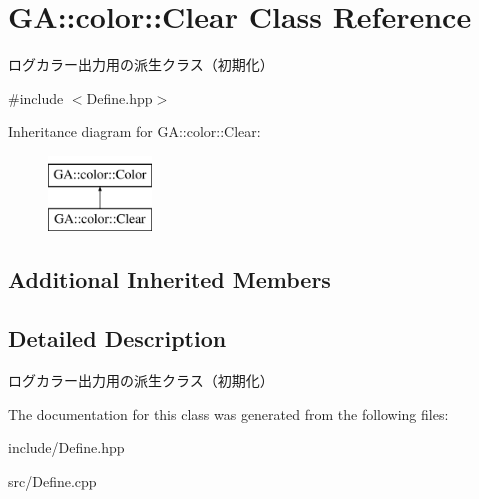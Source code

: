 \hypertarget{class_g_a_1_1color_1_1_clear}{}\section{GA\+::color\+::Clear Class Reference}
\label{class_g_a_1_1color_1_1_clear}


ログカラー出力用の派生クラス（初期化）  




{\ttfamily \#include $<$Define.\+hpp$>$}

Inheritance diagram for GA\+::color\+::Clear\+:\begin{figure}[H]
\begin{center}
\leavevmode
\includegraphics[height=2.000000cm]{class_g_a_1_1color_1_1_clear}
\end{center}
\end{figure}
\subsection*{Additional Inherited Members}


\subsection{Detailed Description}
ログカラー出力用の派生クラス（初期化） 



The documentation for this class was generated from the following files\+:\begin{DoxyCompactItemize}
\item 
include/Define.\+hpp\item 
src/Define.\+cpp\end{DoxyCompactItemize}
